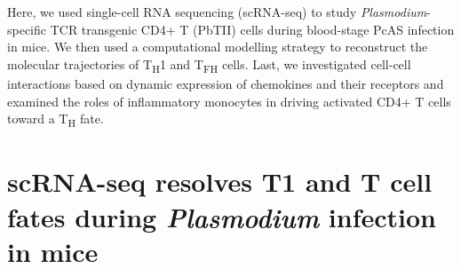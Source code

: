 Here, we used single-cell RNA sequencing (scRNA-seq) to study \textit{Plasmodium}-specific TCR transgenic CD4+ T (PbTII) cells during blood-stage PcAS infection in mice. We then used a computational modelling strategy to reconstruct the molecular trajectories of T\textsubscript{H}1 and T\textsubscript{FH} cells. Last, we investigated cell-cell interactions based on dynamic expression of chemokines and their receptors and examined the roles of inflammatory monocytes in driving activated CD4+ T cells toward a T\textsubscript{H} fate.

\section{scRNA-seq resolves \texorpdfstring{T1}{TH1} and \texorpdfstring{T}{TFH} cell fates during \textit{Plasmodium} infection in mice}


